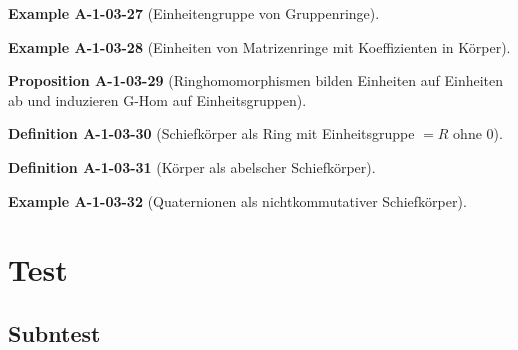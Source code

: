 \documentclass[10pt, letterpaper]{article}
\newcommand{\CustomHeading}[3]{%
  \par\medskip\noindent%
  \textbf{#1 #2} \textnormal{(#3)}.\enskip%
}
\newenvironment{DEF}[2]{\CustomHeading{Definition}{#1}{#2}}{}
\newenvironment{PROP}[2]{\CustomHeading{Proposition}{#1}{#2}}{}
\newenvironment{EXA}[2]{\CustomHeading{Example}{#1}{#2}}{}
\begin{document}

\begin{EXA}{A-1-03-27}{Einheitengruppe von Gruppenringe}
\end{EXA}


\begin{EXA}{A-1-03-28}{Einheiten von Matrizenringe mit Koeffizienten in Körper}
\end{EXA}


\begin{PROP}{A-1-03-29}{Ringhomomorphismen bilden Einheiten auf Einheiten ab und induzieren G-Hom auf Einheitsgruppen}
\end{PROP}


\begin{DEF}{A-1-03-30}{Schiefkörper als Ring mit Einheitsgruppe $= R$ ohne $0$}
\end{DEF}


\begin{DEF}{A-1-03-31}{Körper als abelscher Schiefkörper}
\end{DEF}


\begin{EXA}{A-1-03-32}{Quaternionen als nichtkommutativer Schiefkörper}
\end{EXA}

\section{Test}

\subsection{Subntest}
\end{document}
